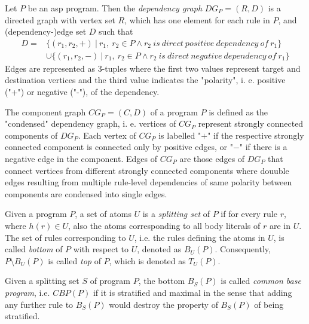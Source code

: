 \begin{definition}
\label{def:prelims-asp-semantics-depgraph}
Let $P$ be an \gls{asp} program. Then the \emph{dependency graph}  $\mathit{DG}_P = (R, D)$ is a directed graph with vertex set $R$, which has one element for each rule in $P$, and (dependency-)edge set $D$ such that
\begin{align*}
	D = &\{ (r_1, r_2, +)\ |\ r_1,\ r_2 \in P \land r_2\ \mathit{is\ direct\ positive\ dependency\ of}\ r_1 \}\\ &\cup
\{ (r_1, r_2, -)\ |\ r_1,\ r_2 \in P \land r_2\ \mathit{is\ direct\ negative\ dependency\ of}\ r_1 \}
\end{align*}
Edges are represented as 3-tuples where the first two values represent target and destination vertices and the third value indicates the "polarity", i. e. positive ("+") or negative ("-"), of the dependency.
\end{definition}

\begin{definition}
\label{def:prelims-asp-semantics-compgraph}
The component graph $\mathit{CG}_P = (C, D)$ of a program $P$ is defined as the "condensed" dependency graph, i. e. vertices of $\mathit{CG}_P$ represent strongly connected components of $\mathit{DG}_P$. Each vertex of $\mathit{CG}_P$ is labelled "$+$" if the respective strongly connected component is connected only by positive edges, or "$-$" if there is a negative edge in the component. Edges of $\mathit{CG}_P$ are those edges of $\mathit{DG}_P$ that connect vertices from different strongly connected components where douuble edges resulting from multiple rule-level dependencies of same polarity between components are condensed into single edges.
\end{definition}

\begin{definition}
\label{def:prelims-asp-semantics-splitting-set}
Given a program $P$, a set of atoms $U$ is a \emph{splitting set} of $P$ if for every rule $r$, where $h(r) \in U$, also the atoms corresponding to all body literals of $r$ are in $U$. The set of rules corresponding to $U$, i.e. the rules defining the atoms in $U$, is called \emph{bottom} of $P$ with respect to $U$, denoted as $B_U(P)$. Consequently, $P \setminus B_U(P)$ is called \emph{top} of $P$, which is denoted as $T_U(P)$.
\end{definition}

\begin{definition}
\label{def:prelims-asp-semantics-cbp}
Given a splitting set $S$ of program $P$, the bottom $B_S(P)$ is called \emph{common base program}, i.e. $CBP(P)$ if it is stratified and maximal in the sense that adding any further rule to $B_S(P)$ would destroy the property of $B_S(P)$ of being stratified.
\end{definition}

